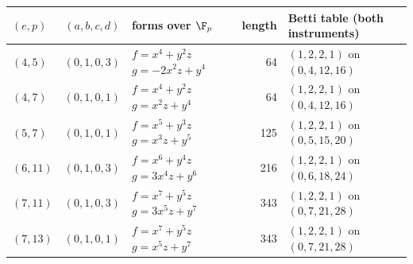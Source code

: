 \begin{tabular}{@{}lc>{\raggedright\arraybackslash}p{5.4cm}rl@{}}
\toprule
$(e,p)$ & $(a,b,c,d)$ & forms over $\F_p$ & length & Betti table (both instruments)\\
\midrule
$(4,5)$ & $(0,1,0,3)$ & $f=x^{4} + y^{2}z$\newline $g=-2x^{2}z + y^{4}$ & 64 & $(1,2,2,1)$ on $(0,4,12,16)$\\
$(4,7)$ & $(0,1,0,1)$ & $f=x^{4} + y^{2}z$\newline $g=x^{2}z + y^{4}$ & 64 & $(1,2,2,1)$ on $(0,4,12,16)$\\
$(5,7)$ & $(0,1,0,1)$ & $f=x^{5} + y^{3}z$\newline $g=x^{3}z + y^{5}$ & 125 & $(1,2,2,1)$ on $(0,5,15,20)$\\
$(6,11)$ & $(0,1,0,3)$ & $f=x^{6} + y^{4}z$\newline $g=3x^{4}z + y^{6}$ & 216 & $(1,2,2,1)$ on $(0,6,18,24)$\\
$(7,11)$ & $(0,1,0,3)$ & $f=x^{7} + y^{5}z$\newline $g=3x^{5}z + y^{7}$ & 343 & $(1,2,2,1)$ on $(0,7,21,28)$\\
$(7,13)$ & $(0,1,0,1)$ & $f=x^{7} + y^{5}z$\newline $g=x^{5}z + y^{7}$ & 343 & $(1,2,2,1)$ on $(0,7,21,28)$\\
\bottomrule
\end{tabular}
